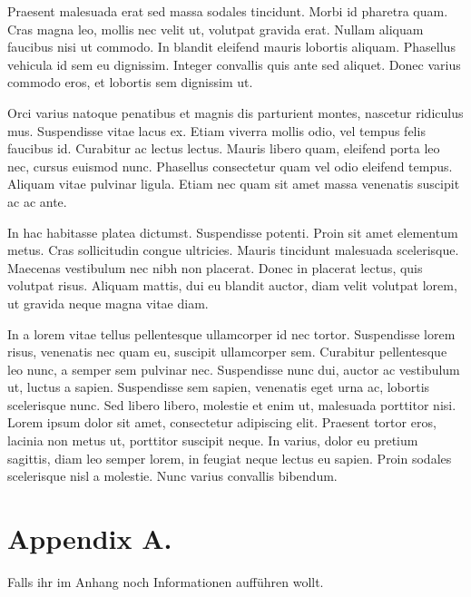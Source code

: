 \documentclass[twoside,11pt,abbrvbib]{article}
\begin{document}
Praesent malesuada erat sed massa sodales tincidunt. Morbi id pharetra quam. Cras magna leo, mollis nec velit ut, volutpat gravida erat. Nullam aliquam faucibus nisi ut commodo. In blandit eleifend mauris lobortis aliquam. Phasellus vehicula id sem eu dignissim. Integer convallis quis ante sed aliquet. Donec varius commodo eros, et lobortis sem dignissim ut.

Orci varius natoque penatibus et magnis dis parturient montes, nascetur ridiculus mus. Suspendisse vitae lacus ex. Etiam viverra mollis odio, vel tempus felis faucibus id. Curabitur ac lectus lectus. Mauris libero quam, eleifend porta leo nec, cursus euismod nunc. Phasellus consectetur quam vel odio eleifend tempus. Aliquam vitae pulvinar ligula. Etiam nec quam sit amet massa venenatis suscipit ac ac ante.

In hac habitasse platea dictumst. Suspendisse potenti. Proin sit amet elementum metus. Cras sollicitudin congue ultricies. Mauris tincidunt malesuada scelerisque. Maecenas vestibulum nec nibh non placerat. Donec in placerat lectus, quis volutpat risus. Aliquam mattis, dui eu blandit auctor, diam velit volutpat lorem, ut gravida neque magna vitae diam.

In a lorem vitae tellus pellentesque ullamcorper id nec tortor. Suspendisse lorem risus, venenatis nec quam eu, suscipit ullamcorper sem. Curabitur pellentesque leo nunc, a semper sem pulvinar nec. Suspendisse nunc dui, auctor ac vestibulum ut, luctus a sapien. Suspendisse sem sapien, venenatis eget urna ac, lobortis scelerisque nunc. Sed libero libero, molestie et enim ut, malesuada porttitor nisi. Lorem ipsum dolor sit amet, consectetur adipiscing elit. Praesent tortor eros, lacinia non metus ut, porttitor suscipit neque. In varius, dolor eu pretium sagittis, diam leo semper lorem, in feugiat neque lectus eu sapien. Proin sodales scelerisque nisl a molestie. Nunc varius convallis bibendum.




\newpage

\appendix
\section*{Appendix A.}
\label{app:theorem}

Falls ihr im Anhang noch Informationen aufführen wollt.


\vskip 0.2in
\end{document}

